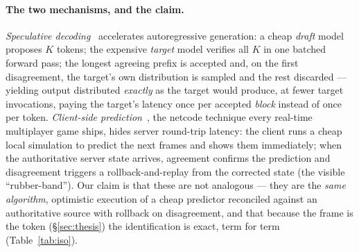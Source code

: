 \documentclass[11pt]{article}
\begin{document}
\paragraph{The two mechanisms, and the claim.} \emph{Speculative decoding}~\cite{leviathan,chen} accelerates
autoregressive generation: a cheap \emph{draft} model proposes $K$ tokens; the expensive \emph{target} model
verifies all $K$ in one batched forward pass; the longest agreeing prefix is accepted and, on the first
disagreement, the target's own distribution is sampled and the rest discarded --- yielding output distributed
\emph{exactly} as the target would produce, at fewer target invocations, paying the target's latency once per
accepted \emph{block} instead of once per token. \emph{Client-side prediction}~\cite{bernier}, the netcode
technique every real-time multiplayer game ships, hides server round-trip latency: the client runs a cheap
local simulation to predict the next frames and shows them immediately; when the authoritative server state
arrives, agreement confirms the prediction and disagreement triggers a rollback-and-replay from the corrected
state (the visible ``rubber-band''). Our claim is that these are not analogous --- they are the \emph{same
algorithm}, optimistic execution of a cheap predictor reconciled against an authoritative source with rollback
on disagreement, and that because the frame is the token (\S\ref{sec:thesis}) the identification is exact,
term for term (Table~\ref{tab:iso}).
\end{document}
